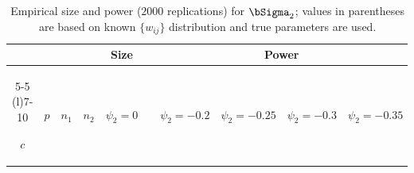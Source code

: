 \begin{table}[htbp]

    \caption{Empirical size and power ($2000$ replications) for $\bSigma_2$; values in parentheses are based on known $\{w_{ij}\}$ distribution and true parameters are used.}

    \label{tab:covtest-Sigma2}

    \scriptsize

    \begin{tabular}{ccccrrrrrr}

        \toprule

        &   &     &     & \multicolumn{1}{c}{Size} & \multicolumn{1}{c}{} & \multicolumn{4}{c}{Power} \\

        \cmidrule(lr){5-5} \cmidrule(l){7-10}

        $c$ & $p$ & $n_1$ & $n_2$ & \multicolumn{1}{c}{{\tiny $\psi_2=0$}} & \multicolumn{1}{c}{} & \multicolumn{1}{c}{{\tiny $\psi_2=-0.2$}} & \multicolumn{1}{c}{{\tiny $\psi_2=-0.25$}} & \multicolumn{1}{c}{{\tiny $\psi_2=-0.3$}} & \multicolumn{1}{c}{{\tiny $\psi_2=-0.35$}} \\

        \midrule


\end{tabular}
\end{table}
